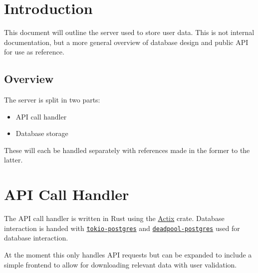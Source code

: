 \documentclass{../../Reports/custom}
\author{Rosie Bartlett}
\begin{document}
\maketitle

\section*{Introduction}
This document will outline the server used to store user data. This is not internal documentation, but a more general overview of database design and public API for use as reference.

\subsection*{Overview}

The server is split in two parts:
\begin{itemize}
	\item API call handler
	\item Database storage
\end{itemize}

These will each be handled separately with references made in the former to the latter.

\setcounter{tocdepth}{2}
\tableofcontents

\newpage

\section{API Call Handler}

The API call handler is written in Rust using the \href{https://actix.rs/}{Actix} crate. Database interaction is handed with \href{https://crates.io/crates/tokio-postgres}{\texttt{tokio-postgres}} and \href{https://crates.io/crates/deadpool-postgres}{\texttt{deadpool-postgres}} used for database interaction.

At the moment this only handles API requests but can be expanded to include a simple frontend to allow for downloading relevant data with user validation.
\end{document}
